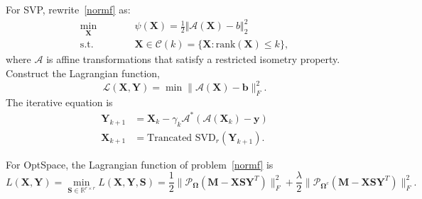 \documentclass{article}
\begin{document}
{For SVP, rewrite~\eqref{normf} as:
\begin{equation}
    \begin{aligned}
        \min_{\mathbf X}\qquad&\quad \psi (\mathbf X) = \frac{1}{2}\Vert \mathcal{A}(\mathbf X) - b\Vert_2^2\\
        \text{s.t.}\qquad&\quad\mathbf X \in \mathcal{C}(k) = \{\mathbf X \colon \text{rank}(\mathbf X) \leq k\},
    \end{aligned}
\end{equation}
where $\mathcal{A}$ is affine transformations that satisfy a restricted isometry property.
Construct the Lagrangian function,
\begin{equation}
    \mathcal{L}(\mathbf X,\mathbf Y) = \min \lVert \mathcal{A}(\mathbf X) -\mathbf b \rVert_F^2.
\end{equation}
The iterative equation is
\begin{equation}
    \begin{aligned}
        \mathbf Y_{k+1} & = \mathbf X_{k} - \gamma_k \mathcal{A}^*(\mathcal{A}(\mathbf X_k)-\mathbf y)\\
        \mathbf X_{k+1} & = \text{Trancated SVD}_r(\mathbf Y_{k+1}).
    \end{aligned}
\end{equation}

For OptSpace, the Lagrangian function of problem~\eqref{normf} is
\begin{equation}
    L(\mathbf X,\mathbf Y) = \min_{\mathbf S\in\mathbb R^{r\times r}} L(\mathbf X,\mathbf Y,\mathbf S) = \frac{1}{2}\lVert\mathcal P_{\mathbf\Omega}(\mathbf M-\mathbf X\mathbf S\mathbf Y^T)\rVert^2_F + \frac{\lambda}{2}\lVert\mathcal P_{\mathbf\Omega^c}(\mathbf M-\mathbf X\mathbf S\mathbf Y^T)
\rVert^2_F.
\end{equation}



}
\end{document}
